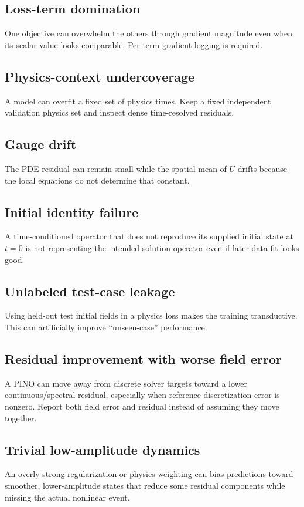 \documentclass[11pt]{article}
\begin{document}
\subsection{Loss-term domination}
One objective can overwhelm the others through gradient magnitude even when its scalar value looks comparable. Per-term gradient logging is required.

\subsection{Physics-context undercoverage}
A model can overfit a fixed set of physics times. Keep a fixed independent validation physics set and inspect dense time-resolved residuals.

\subsection{Gauge drift}
The PDE residual can remain small while the spatial mean of $U$ drifts because the local equations do not determine that constant.

\subsection{Initial identity failure}
A time-conditioned operator that does not reproduce its supplied initial state at $t=0$ is not representing the intended solution operator even if later data fit looks good.

\subsection{Unlabeled test-case leakage}
Using held-out test initial fields in a physics loss makes the training transductive. This can artificially improve ``unseen-case'' performance.

\subsection{Residual improvement with worse field error}
A PINO can move away from discrete solver targets toward a lower continuous/spectral residual, especially when reference discretization error is nonzero. Report both field error and residual instead of assuming they move together.

\subsection{Trivial low-amplitude dynamics}
An overly strong regularization or physics weighting can bias predictions toward smoother, lower-amplitude states that reduce some residual components while missing the actual nonlinear event.
\end{document}

